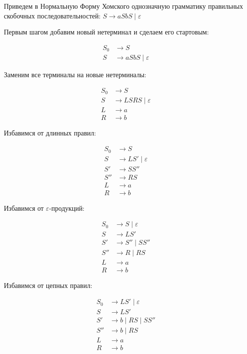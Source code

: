 \begin{example}
  Приведем в Нормальную Форму Хомского однозначную грамматику правильных скобочных последовательностей: $S \to a S b S \mid \varepsilon$

  Первым шагом добавим новый нетерминал и сделаем его стартовым:

  \begin{align*}
    S_0 &\to S  \\
    S   &\to a S b S \mid \varepsilon
  \end{align*}

  Заменим все терминалы на новые нетерминалы:

  \begin{align*}
    S_0 &\to S \\
    S   &\to L S R S \mid \varepsilon \\
    L   &\to a \\
    R   &\to b
  \end{align*}

  Избавимся от длинных правил:

  \begin{align*}
    S_0 &\to S \\
    S   &\to L S' \mid \varepsilon \\
    S'  &\to S S'' \\
    S'' &\to R S \\
    L   &\to a \\
    R   &\to b
  \end{align*}

  Избавимся от $\varepsilon$-продукций:

  \begin{align*}
    S_0 &\to S \mid \varepsilon \\
    S   &\to L S' \\
    S'  &\to S'' \mid S S'' \\
    S'' &\to R   \mid R S \\
    L   &\to a \\
    R   &\to b
  \end{align*}

  Избавимся от цепных правил:

  \begin{align*}
    S_0 &\to L S' \mid \varepsilon \\
    S   &\to L S' \\
    S'  &\to b \mid R S \mid S S'' \\
    S'' &\to b \mid R S \\
    L   &\to a \\
    R   &\to b
  \end{align*}
\end{example}

